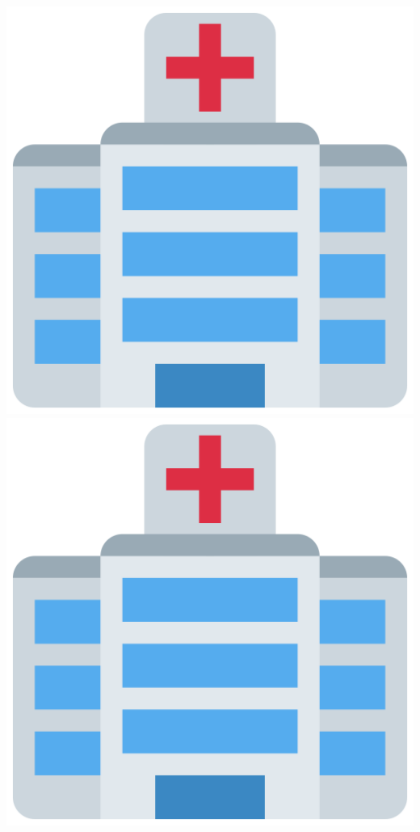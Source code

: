 \begin{frame}
    \vspace{0.5cm}
    \includegraphics[scale=0.1]{Bin/cartoon_pics/hospital.png}
    \hspace{3cm}
    \includegraphics[scale=0.1]{Bin/cartoon_pics/hospital.png}

\end{frame}


